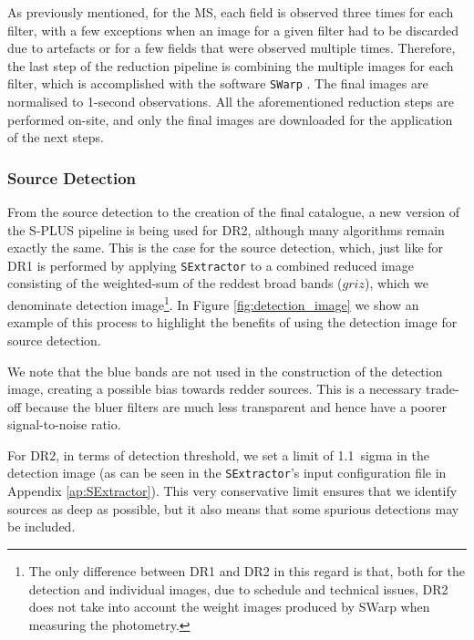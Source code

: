 \documentclass[fleqn,usenatbib]{mnras}
\begin{document}


As previously mentioned, for the MS, each field is observed three times for each filter, with a few exceptions when an image for a given filter had to be discarded due to artefacts or for a few fields that were observed multiple times. Therefore, the last step of the reduction pipeline is combining the multiple images for each filter, which is accomplished with the software \texttt{SWarp} \citep{SWarp2002ASPC..281..228B}. The final images are normalised to 1-second observations. All the aforementioned reduction steps are performed on-site, and only the final images are downloaded for the application of the next steps.


\subsubsection{Source Detection}

From the source detection to the creation of the final catalogue, a new version of the S-PLUS pipeline is being used for DR2, although many algorithms remain exactly the same. This is the case for the source detection, which, just like for DR1 is performed by applying \texttt{SExtractor} to a combined reduced image consisting of the weighted-sum of the reddest broad bands ($griz$), which we denominate detection image\footnote{The only difference between DR1 and DR2 in this regard is that, both for the detection and individual images, due to schedule and technical issues, DR2 does not take into account the weight images produced by SWarp when measuring the photometry.}. In Figure \ref{fig:detection_image} we show an example of this process to highlight the benefits of using the detection image for source detection.

We note that the blue bands are not used in the construction of the detection image, creating a possible bias towards redder sources. This is a necessary trade-off because the bluer filters are much less transparent and hence have a poorer signal-to-noise ratio.

For DR2, in terms of detection threshold, we set a limit of 1.1~sigma in the detection image (as can be seen in the \texttt{SExtractor}'s input configuration file in Appendix \ref{ap:SExtractor}). This very conservative limit ensures that we identify sources as deep as possible, but it also means that some spurious detections may be included.
\end{document}
